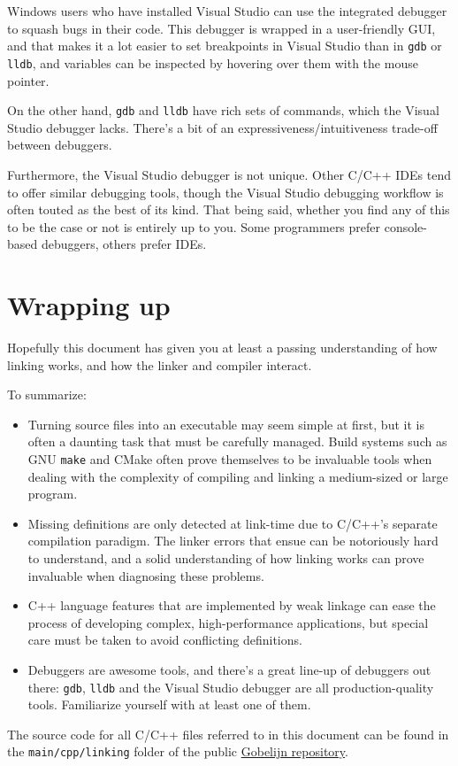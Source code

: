 \documentclass[12pt,a4paper]{article}
\newcommand{\C}{C}
\newcommand{\Cpp}{C++}
\newcommand{\CCpp}{\C/\Cpp}
\newcommand{\gnu}{GNU}
\newcommand{\gnumake}{\gnu{} \texttt{make}}
\newcommand{\cmake}{CMake}
\newcommand{\gdb}{\texttt{gdb}}
\newcommand{\lldb}{\texttt{lldb}}
\begin{document}
Windows users who have installed Visual Studio can use the integrated debugger to squash bugs in their code. This debugger is wrapped in a user-friendly GUI, and that makes it a lot easier to set breakpoints in Visual Studio than in \gdb{} or \lldb{}, and variables can be inspected by hovering over them with the mouse pointer. 

On the other hand, \gdb{} and \lldb{} have rich sets of commands, which the Visual Studio debugger lacks. There's a bit of an expressiveness/intuitive\-ness trade-off between debuggers.

Furthermore, the Visual Studio debugger is not unique. Other \CCpp{} IDEs tend to offer similar debugging tools, though the Visual Studio debugging workflow is often touted as the best of its kind. That being said, whether you find any of this to be the case or not is entirely up to you. Some programmers prefer console-based debuggers, others prefer IDEs.

\section{Wrapping up}

Hopefully this document has given you at least a passing understanding of how linking works, and how the linker and compiler interact. 

To summarize:

\begin{itemize}
	
	\item Turning source files into an executable may seem simple at first, but it is often a daunting task that must be carefully managed. Build systems such as \gnumake{} and \cmake{} often prove themselves to be invaluable tools when dealing with the complexity of compiling and linking a medium-sized or large program.
	
	\item Missing definitions are only detected at link-time due to \CCpp{}'s separate compilation paradigm. The linker errors that ensue can be notoriously hard to understand, and a solid understanding of how linking works can prove invaluable when diagnosing these problems.
	
	\item \Cpp{} language features that are implemented by weak linkage can ease the process of developing complex, high-performance applications, but special care must be taken to avoid conflicting definitions. 
	
	\item Debuggers are awesome tools, and there's a great line-up of debuggers out there: \gdb{}, \lldb{} and the Visual Studio debugger are all production-quality tools. Familiarize yourself with at least one of them.
	
\end{itemize}

The source code for all \CCpp{} files referred to in this document can be found in the \texttt{main/cpp/linking} folder of the public \href{https://bitbucket.org/comp/gobelijn}{Gobelijn repository}.
\end{document}
